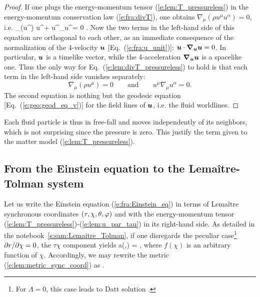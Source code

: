 \begin{proof}
If one plugs the energy-momentum tensor (\ref{e:lem:T_pressureless}) in the
energy-momentum conservation law (\ref{e:fra:divT}), one obtains
$\nabla_\mu (\rho u^\mu u^\alpha )  = 0$,
i.e.
\be \label{e:lem:divT_pressureless}
    \nabla_\mu (\rho u^\mu) u^\alpha + \rho u^\mu \nabla_\mu u^\alpha = 0 .
\ee
Now the two terms in the left-hand side of this equation are orthogonal
to each other, as an immediate consequence of the normalization of the
4-velocity $\bm{u}$ [Eq.~(\ref{e:fra:u_unit})]:
$\bm{u}\cdot \bm{\nabla}_{\bm{u}}\bm{u} = 0$. In particular, $\bm{u}$
is a timelike vector, while the 4-acceleration $\bm{\nabla}_{\bm{u}}\bm{u}$
is a spacelike one. Thus the only way for Eq.~(\ref{e:lem:divT_pressureless})
to hold is  that each term
in the left-hand side vanishes separately:
\[
    \nabla_\mu (\rho u^\mu) = 0 \qquad\mbox{and}\qquad u^\mu \nabla_\mu u^\alpha = 0 .
\]
The second equation is nothing but the geodesic equation [Eq.~(\ref{e:geo:geod_eq_v})]
for the field lines of $\bm{u}$, i.e. the fluid worldlines.
\end{proof}
Each fluid particle is thus in free-fall and moves independently of its
neighbors, which is not surprising since the pressure is zero.
This justify the term  given to the matter
model (\ref{e:lem:T_pressureless}).

\subsection{From the Einstein equation to the Lemaître-Tolman system}

Let us write the Einstein equation (\ref{e:fra:Einstein_eq})
in terms of Lemaître synchronous coordinates $(\tau,\chi,\theta,\varphi)$
and with the energy-momentum tensor (\ref{e:lem:T_pressureless})-(\ref{e:lem:u_par_tau})
in its right-hand side.
As detailed in the notebook~\ref{s:sam:Lemaitre_Tolman},
if one disregards the peculiar case\footnote{For $\Lambda=0$, this case leads to
Datt solution \cite{Datt38}.} ${\partial r}/{\partial \chi} = 0$,
the $\tau\chi$ component yields
\be \label{e:lem:a_f_dr}
    a(\tau,\chi) =   ,
\ee
where $f(\chi)$ is an arbitrary function of $\chi$.
Accordingly, we may rewrite the metric (\ref{e:lem:metric_sync_coord}) as
\be \label{e:lem:metric_Lemaitre}
     .
\ee

